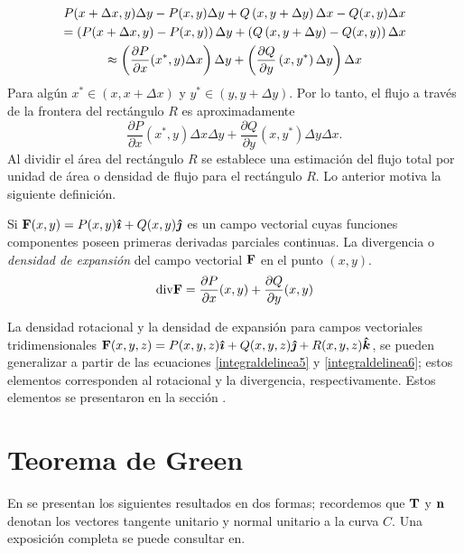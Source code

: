 \begin{gather}
P( x+\Delta x,y) \Delta y-P(x,y) \Delta y+Q\left(x,y+\Delta y\right) \Delta x-Q(x,y) \Delta x \notag\\
= \left( P( x+\Delta x,y) -P(x,y) \right)\Delta y+\left( Q\left( x,y+\Delta y\right) -Q(x,y) \right)\Delta x \notag\\
\approx \left( \frac{\partial P}{\partial x}(x^{\ast },y)\Delta x\right) \Delta y+\left( \frac{\partial Q}{\partial y}\left(x,y^{\ast }\right) \Delta y\right) \Delta x
\end{gather}
Para algún $x^* \in (x,x+\Delta x)$ y $y^* \in (y,y+\Delta y)$.
Por lo tanto, el flujo a través de la frontera del rectángulo $R$ es aproximadamente
\[\frac{\partial P}{\partial x}(x^*,y) \Delta x\Delta y+\frac{\partial Q}{\partial y}(x,y^*) \Delta y\Delta x.\]
Al dividir  el área del rectángulo $R$ se establece una estimación del flujo total por unidad de área o densidad de flujo para el rectángulo $R$. Lo anterior motiva la siguiente definición.

\begin{defi}
Si ${\bf F} (x,y)=P(x,y) \boldsymbol{\hat{\imath}}+Q(x,y) \boldsymbol{\hat{\jmath}}$ es un campo vectorial cuyas funciones componentes poseen primeras derivadas parciales continuas.
La divergencia o \textit{densidad de expansión} del campo vectorial ${\bf F}$ en el punto $(x,y)$.
\begin{equation} \label{integraldelinea6}
{\rm div}{\bf F} =\frac{\partial P}{\partial x}(x,y) +\frac{\partial Q}{\partial y}(x,y)
\end{equation}
 
\end{defi}

La densidad rotacional y la densidad de expansión para campos vectoriales tridimensionales ${\bf F}(x,y,z) =P(x,y,z)\boldsymbol{\hat{\imath}} +Q(x,y,z)\boldsymbol{\hat{\jmath}}+R(x,y,z)\boldsymbol{\hat{k}}$,
se pueden generalizar a partir de las ecuaciones \ref{integraldelinea5}  y \ref{integraldelinea6};
estos elementos corresponden al rotacional y la divergencia, respectivamente.
Estos elementos se presentaron en la sección .
 

\section{Teorema de Green} \label{teoremadegreen}
En \cite{thomas_calculo_2015} se presentan los siguientes resultados en dos formas; recordemos que ${\bf T}$ y ${\bf n}$
denotan los vectores tangente unitario y normal unitario a la curva $C$.
Una exposición completa se puede consultar en\cite{acosta_gempeler_doce_2020}.

